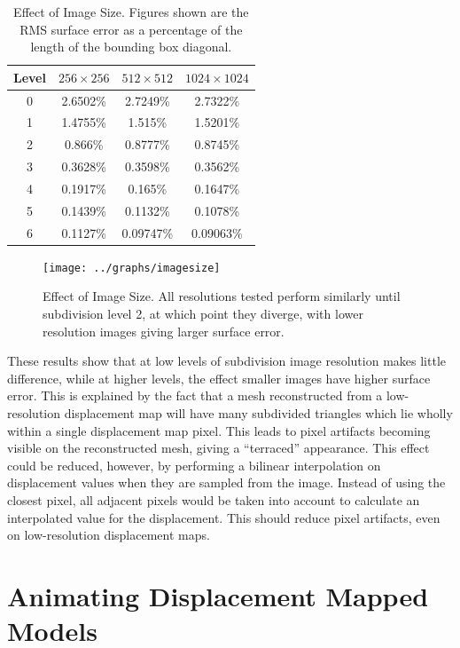 \begin{table}
\begin{center}
\begin{tabular}{c||ccc} 
Level & $256\times256$ & $512\times512$ & $1024\times1024$ \\
\hline
0 & 2.6502\% & 2.7249\% & 2.7322\% \\
1 & 1.4755\% & 1.515\% & 1.5201\% \\
2 & 0.866\% & 0.8777\% & 0.8745\% \\
3 & 0.3628\% & 0.3598\% & 0.3562\% \\
4 & 0.1917\% & 0.165\% & 0.1647\% \\
5 & 0.1439\% & 0.1132\% & 0.1078\% \\
6 & 0.1127\% & 0.09747\% & 0.09063\%
\end{tabular}
\caption[Effect of Image Size]{\label{tbl:imagesize} Effect of Image Size. Figures shown are the RMS surface error as a percentage of the length of the bounding box diagonal.}
\end{center}
\end{table}

\begin{figure}
\begin{center}
\texttt{[image: ../graphs/imagesize]}
\caption[Effect of Image Size]{\label{fig:imagesize} Effect of Image Size. All resolutions tested perform similarly until subdivision level 2, at which point they diverge, with lower resolution images giving larger surface error. }
\end{center}
\end{figure}

These results show that at low levels of subdivision image resolution makes little difference, while at higher levels, the effect smaller images have higher surface error. This is explained by the fact that a mesh reconstructed from a low-resolution displacement map will have many subdivided triangles which lie wholly within a single displacement map pixel. This leads to pixel artifacts becoming visible on the reconstructed mesh, giving a ``terraced'' appearance. This effect could be reduced, however, by performing a bilinear interpolation on displacement values when they are sampled from the image. Instead of using the closest pixel, all adjacent pixels would be taken into account to calculate an interpolated value for the displacement. This should reduce pixel artifacts, even on low-resolution displacement maps.

\section{\label{sec:dispmapanim:animation}Animating Displacement Mapped Models}

